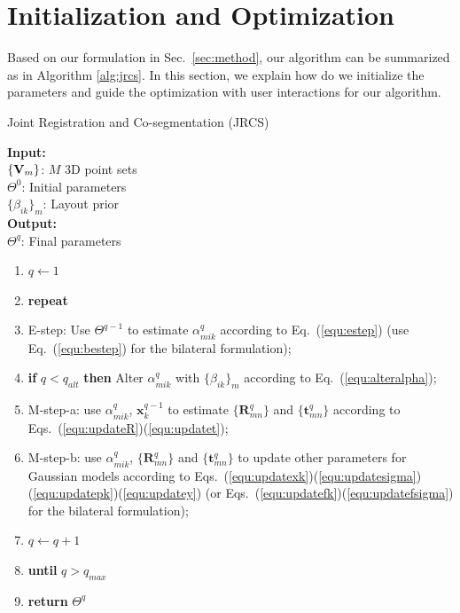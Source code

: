 \section{Initialization and Optimization}
\label{sec:imp}


Based on our formulation in Sec.~\ref{sec:method}, our algorithm can be summarized as in Algorithm \ref{alg:jrcs}.
%
In this section, we explain how do we initialize the parameters and guide the optimization with user interactions for our algorithm.

\begin{algorithm}[htb]
	\caption{Joint Registration and Co-segmentation (JRCS)}
	\label{alg:jrcs}
	\textbf{Input:}~~\\  
	$\{\mathbf{V}_m\}$: $M$ 3D point sets\\
	$\Theta^0$: Initial parameters\\
	$\{\beta_{ik}\}_{m}$: Layout prior\\
	\textbf{Output:}~~\\
	$\Theta^q$: Final parameters~~
	\begin{enumerate}
		\item $q\leftarrow1$
		\item \textbf{repeat}
		\item E-step: Use $\Theta^{q-1}$ to estimate $\alpha_{mik}^q$ according to Eq.~(\ref{equ:estep}) (use Eq.~(\ref{equ:bestep}) for the bilateral formulation);
		\item \textbf{if} $q < q_{alt}$ \textbf{then} Alter $\alpha_{mik}^q$ with $\{\beta_{ik}\}_{m}$ according to Eq.~(\ref{equ:alteralpha});
		\item M-step-a: use $\alpha^q_{mik}$, $\mathbf x^{q-1}_k$ to estimate $\{\mathbf{R}_{mn}^q\}$ and $\{\mathbf t_{mn}^q\}$ according to Eqs.~(\ref{equ:updateR})(\ref{equ:updatet});
		\item M-step-b: use $\alpha^q_{mik}$, $\{\mathbf{R}_{mn}^q\}$ and $\{\mathbf{t}_{mn}^q\}$ to update other parameters for Gaussian models according to Eqs.~(\ref{equ:updatexk})(\ref{equ:updatesigma})(\ref{equ:updatepk})(\ref{equ:updatey})  (or Eqs.~(\ref{equ:updatefk})(\ref{equ:updatefsigma}) for the bilateral formulation);
		\item $q \leftarrow q+1$
		\item \textbf{until} $q > q_{max}$
		\item \textbf{return} $\Theta^q$
	\end{enumerate}
\end{algorithm}



